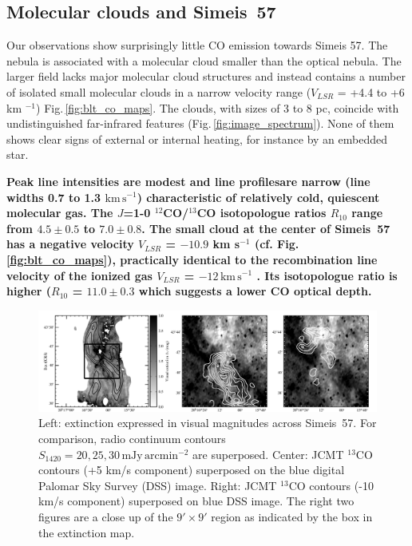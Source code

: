 \documentclass{aa}
\begin{document}
\subsection{Molecular clouds and Simeis~57}

Our observations show surprisingly little CO emission towards Simeis
57. The nebula is associated with a molecular cloud smaller than the
optical nebula. The larger field lacks major molecular cloud
structures and instead contains a number of isolated small molecular
clouds in a narrow velocity range ($V_{LSR}$ = +4.4 to +6 km $^{-1}$)
Fig.\,\ref{fig:blt_co_maps}. The clouds, with sizes of 3 to 8 pc,
coincide with undistinguished far-infrared features
(Fig.\,\ref{fig:image_spectrum}). None of them shows clear signs of
external or internal heating, for instance by an embedded star.

\par \textbf{Peak line intensities are modest and line profilesare
  narrow (line widths 0.7 to 1.3 $\mathrm{km\,s^{-1}}$) characteristic
  of relatively cold, quiescent molecular gas. The $J$=1-0
  $^{12}$CO/$^{13}$CO isotopologue ratios $R_{10}$ range from
  $4.5\pm0.5$ to $7.0\pm0.8$. The small cloud at the center of
  Simeis~57 has a negative velocity $V_{LSR}$ = $-10.9$ km s$^{-1}$
  (cf. Fig.\,\ref{fig:blt_co_maps}), practically identical to the
  recombination line velocity of the ionized gas $V_{LSR}$ =
  $-12\, \mathrm{km\,s^{-1}}$ \citep{Pipenbrink1988}. Its isotopologue
  ratio is higher ($R_{10}$ = $11.0\pm0.3$ which suggests a lower CO
  optical depth.  }


\begin{figure}
\includegraphics[width=1\textwidth]{CO_whitecont.png}
\centering
\caption{Left: extinction expressed in visual magnitudes across
  Simeis~57. For comparison, radio continuum contours
  $S_{1420} = 20,25,30\, \mathrm{mJy \, arcmin^{-2}}$ are
  superposed. Center: JCMT $^{13}$CO contours (+5 km/s component)
  superposed on the blue digital Palomar Sky Survey (DSS)
  image. Right: JCMT $^{13}$CO contours (-10 km/s component)
  superposed on blue DSS image. The right two figures are 
  a close up of the $9' \times 9'$ 
  region as indicated by the box in the extinction map.}
\label{fig:co_extinction_map}
\end{figure}
\end{document}
